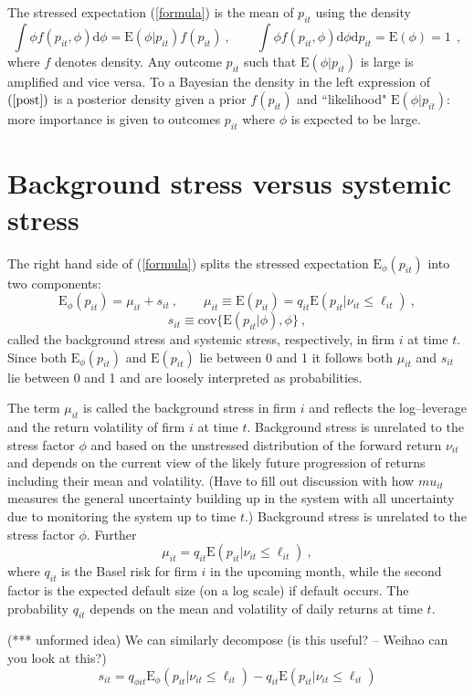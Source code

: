 \documentclass[authoryear]{elsarticle}
\newcommand{\E}{\mathrm{E}}
\newcommand{\cov}{\mathrm{cov}}
\newcommand{\Es}{\E_\phi}
\newcommand{\de}{\mathrm{d}}
\newcommand{\eref}[1]{(\ref{#1})}
\newcommand{\cq}{\ , \qquad}
\newcommand{\be}[1]{\begin{equation}\label{#1}}
\newcommand{\ee}{\end{equation}}
\begin{document}
The stressed expectation \eref{formula}  is the mean of $p_{it}$  using the  density
\be{post}
\int \phi f(p_{it},\phi)\de \phi= \E(\phi|p_{it})f(p_{it})\cq \int \phi f(p_{it},\phi)\de \phi\de p_{it} = \E(\phi) = 1\ 
\  ,
\ee
where $f$ denotes density.  
Any outcome $p_{it}$ such that $\E(\phi|p_{it})$ is large  is amplified and vice versa.   To a Bayesian the density in the left  expression of $\eref{post}$ is a posterior density given a prior $f(p_{it})$ and ``likelihood" $\E(\phi|p_{it})$: more importance is given to outcomes   $p_{it}$  where $\phi$ is expected to be large. 

\section{Background stress versus systemic stress}

The right hand side of \eref{formula} splits the stressed expectation $\Es(p_{it})$ into two components: 
\be{vsstress}
\Es(p_{it}) =\mu_{it}+s_{it}\cq 
 \mu_{it} \equiv \E(p_{it})=q_{it}\E(p_{it}|\nu_{it}\le \ell_{it}) \ ,
\ee
$$
s_{it} \equiv \cov\{\E(p_{it}|\phi),\phi\}\ , 
$$
called  the background stress  and systemic stress, respectively, in firm $i$ at time $t$.  Since both $\Es(p_{it})$ and $\E(p_{it})$ lie between 0 and 1 it follows both $\mu_{it}$ and $s_{it}$ lie between 0 and 1 and  are loosely interpreted as probabilities. 

The  term $\mu_{it}$  is called the background stress in firm $i$ and  reflects the log--leverage and the return volatility of firm $i$ at time $t$.  Background stress is unrelated to the stress factor $\phi$ and based on the unstressed distribution of the forward return $\nu_{it}$ and depends on the current view of the likely future progression of returns including their mean and volatility.     (Have to fill out discussion with how $mu_{it}$ measures the general uncertainty building up in the system with all  uncertainty  due to monitoring the system up to time $t$.)  Background stress is unrelated to the stress factor $\phi$.  Further
\be{mstress}
\mu_{it}=q_{it}\E(p_{it}|\nu_{it}\le \ell_{it})\ ,
\ee
where  $q_{it}$ is the Basel risk for  firm $i$  in the upcoming month,  while the second factor is the expected default size  (on a log scale)  if default occurs.
The probability $q_{it}$ depends on the  mean and volatility of daily returns at time $t$.

(*** unformed idea)   We can similarly decompose   (is this useful? -- Weihao can you look at this?)
$$
s_{it} = q_{\phi it}\E_\phi(p_{it}|\nu_{it}\le \ell_{it})-q_{it}\E(p_{it}|\nu_{it} \le \ell_{it})
$$      
\end{document}
